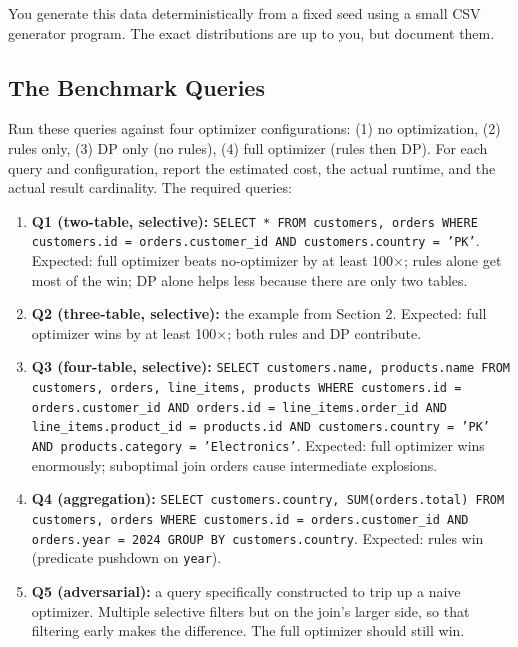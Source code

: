 \documentclass[11pt,a4paper]{article}
\begin{document}
You generate this data deterministically from a fixed seed using a small CSV generator program. The exact distributions are up to you, but document them.

\subsection{The Benchmark Queries}
Run these queries against four optimizer configurations: (1) no optimization, (2) rules only, (3) DP only (no rules), (4) full optimizer (rules then DP). For each query and configuration, report the estimated cost, the actual runtime, and the actual result cardinality. The required queries:

\begin{enumerate}
\item \textbf{Q1 (two-table, selective):} \texttt{SELECT * FROM customers, orders WHERE customers.id = orders.customer\_id AND customers.country = 'PK'}. Expected: full optimizer beats no-optimizer by at least 100$\times$; rules alone get most of the win; DP alone helps less because there are only two tables.

\item \textbf{Q2 (three-table, selective):} the example from Section 2. Expected: full optimizer wins by at least 100$\times$; both rules and DP contribute.

\item \textbf{Q3 (four-table, selective):} \texttt{SELECT customers.name, products.name FROM customers, orders, line\_items, products WHERE customers.id = orders.customer\_id AND orders.id = line\_items.order\_id AND line\_items.product\_id = products.id AND customers.country = 'PK' AND products.category = 'Electronics'}. Expected: full optimizer wins enormously; suboptimal join orders cause intermediate explosions.

\item \textbf{Q4 (aggregation):} \texttt{SELECT customers.country, SUM(orders.total) FROM customers, orders WHERE customers.id = orders.customer\_id AND orders.year = 2024 GROUP BY customers.country}. Expected: rules win (predicate pushdown on \texttt{year}).

\item \textbf{Q5 (adversarial):} a query specifically constructed to trip up a naive optimizer. Multiple selective filters but on the join's larger side, so that filtering early makes the difference. The full optimizer should still win.
\end{enumerate}
\end{document}
